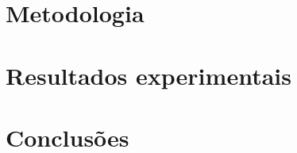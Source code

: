 \documentclass[
	12pt,				%
	oneside,			%
	a4paper,			%
	english,			%
	brazil				%
	]{abntex2ppgsi}
\begin{document}
\frenchspacing 


%
% 
%
\imprimircapa

\imprimirfolhaderosto*



\setlength{\absparsep}{18pt} %


\tableofcontents*
\cleardoublepage




\textual






\chapter{Metodologia}
\chapter{Resultados experimentais}
\chapter{Conclusões}
\end{document}
